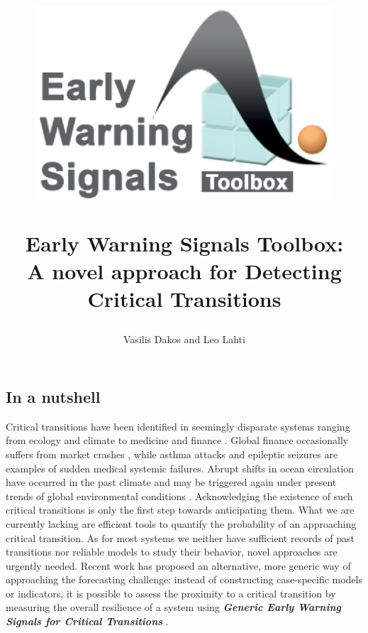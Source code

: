 \documentclass[12pt,a4paper,final]{article}
\author{Vasilis Dakos and Leo Lahti}
\title{
\begin{figure}[h]
\includegraphics[scale=0.55]{logoEWS.eps}
\end{figure}
Early Warning Signals Toolbox:\\ 
A novel approach for Detecting Critical Transitions
}
\begin{document}
\maketitle

\begin{doublespacing}

\section{In a nutshell} %

Critical transitions have been identified in seemingly disparate systems ranging from ecology and climate to medicine and finance \cite{Scheffer2001a,Scheffer2012}. Global finance occasionally suffers from market crashes \cite{May2008}, while asthma attacks \cite{Venegas2005} and epileptic seizures \cite{McSharry2003,Kramer2012} are examples of sudden medical systemic failures. Abrupt shifts in ocean circulation have occurred in the past climate \cite{Rahmstorf2002} and may be triggered again under present trends of global environmental conditions \cite{Lenton2011}.
Acknowledging the existence of such critical transitions is only the first step towards anticipating them. What we are currently lacking are efficient tools to quantify the probability of an approaching critical transition. As for most systems we neither have sufficient records of past transitions nor reliable models to study their behavior, novel approaches are urgently needed. Recent work has proposed an alternative, more generic way of approaching the forecasting challenge: instead of constructing case-specific models or indicators, it is possible to assess the proximity to a critical transition by measuring the overall resilience of a system using \textit{\textbf{Generic Early Warning Signals for Critical Transitions}} \cite{Scheffer2009a}.\\
\\
\\


\end{doublespacing}
\end{document}

